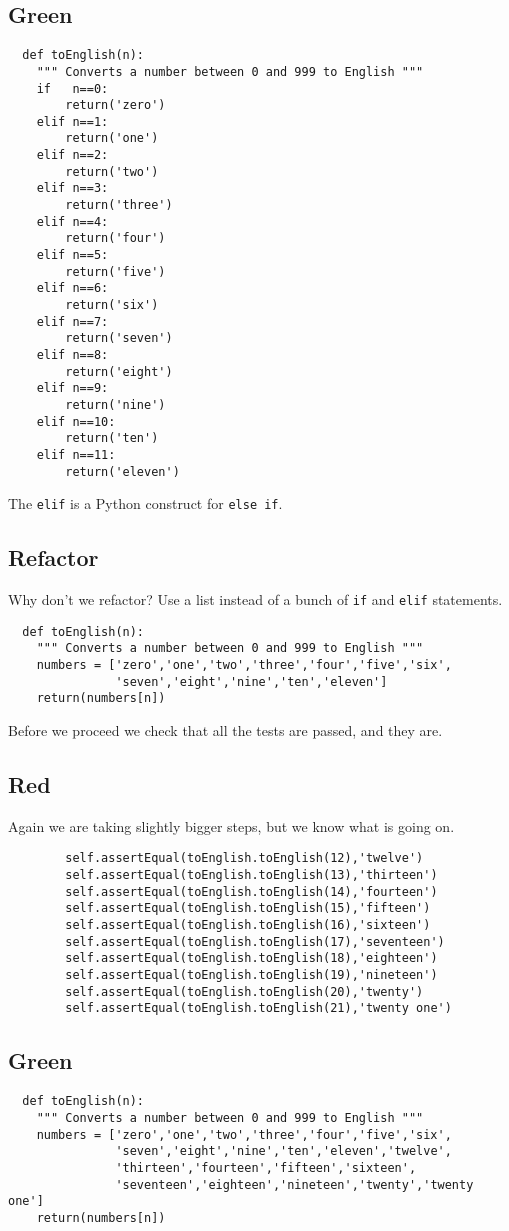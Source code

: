 \documentclass{paper}
\begin{document}
\subsection{Green}
\begin{lstlisting}
  def toEnglish(n):
    """ Converts a number between 0 and 999 to English """
    if   n==0:
        return('zero')
    elif n==1:
        return('one')
    elif n==2:
        return('two')
    elif n==3:
        return('three')
    elif n==4:
        return('four')
    elif n==5:
        return('five')
    elif n==6:
        return('six')
    elif n==7:
        return('seven')
    elif n==8:
        return('eight')
    elif n==9:
        return('nine')
    elif n==10:
        return('ten')
    elif n==11:
        return('eleven')
\end{lstlisting}
The {\tt elif} is a Python construct for {\tt else if}.

\subsection{Refactor}
Why don't we refactor? Use a list instead of  a bunch of {\tt if} and
 {\tt  elif} statements. 
\begin{lstlisting}
  def toEnglish(n):
    """ Converts a number between 0 and 999 to English """
    numbers = ['zero','one','two','three','four','five','six',
               'seven','eight','nine','ten','eleven']
    return(numbers[n])
\end{lstlisting}
Before we proceed we check that all the tests are passed, and they
are.
\subsection{Red}
Again we are taking slightly bigger steps, but we know what is going
on.
\begin{lstlisting}
        self.assertEqual(toEnglish.toEnglish(12),'twelve')	
        self.assertEqual(toEnglish.toEnglish(13),'thirteen')	
        self.assertEqual(toEnglish.toEnglish(14),'fourteen')
        self.assertEqual(toEnglish.toEnglish(15),'fifteen')
        self.assertEqual(toEnglish.toEnglish(16),'sixteen')
        self.assertEqual(toEnglish.toEnglish(17),'seventeen')
        self.assertEqual(toEnglish.toEnglish(18),'eighteen')
        self.assertEqual(toEnglish.toEnglish(19),'nineteen')
        self.assertEqual(toEnglish.toEnglish(20),'twenty')
        self.assertEqual(toEnglish.toEnglish(21),'twenty one')
\end{lstlisting}
\subsection{Green}
\begin{lstlisting}
  def toEnglish(n):
    """ Converts a number between 0 and 999 to English """
    numbers = ['zero','one','two','three','four','five','six',
               'seven','eight','nine','ten','eleven','twelve',
               'thirteen','fourteen','fifteen','sixteen',
               'seventeen','eighteen','nineteen','twenty','twenty one']
    return(numbers[n])
\end{lstlisting}
\end{document}
